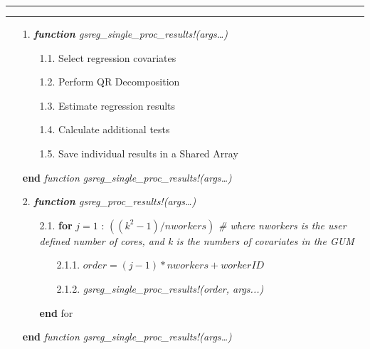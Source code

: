 \documentclass{juliacon}
\begin{document}
\begin{minipage}{0.5\textwidth}
\hrule
{}
\vspace{2mm}
\hrule
  \begin{enumerate}
    
    \item[1.] \textit{\textbf{function} gsreg\_single\_proc\_results!(args…)}
    \begin{enumerate}
        \item[1.1.] Select regression covariates
        \item[1.2.] Perform QR Decomposition
        \item[1.3.] Estimate regression results
        \item[1.4.] Calculate additional tests
        \item[1.5.] Save individual results in a Shared Array
    \end{enumerate}
    \item[] \textbf{end} \textit{function gsreg\_single\_proc\_results!(args…)}

\vspace{2mm}
    
    \item[2.] \textit{\textbf{function} gsreg\_proc\_results!(args…)}
    \begin{enumerate}
        \item[2.1.] \textbf{for} $j=1$ : $((k^2-1)/ nworkers)$ \textit{\# where nworkers is the user defined number of cores, and k is the numbers of covariates in the GUM}
        \begin{enumerate}
            \item[2.1.1.] $order = (j -1) * nworkers + workerID$
            \item[2.1.2.] \textit{gsreg\_single\_proc\_results!(order, args...)}
        \end{enumerate}
        \item[] \textbf{end} for
    \end{enumerate}
    \item[] \textbf{end} \textit{function gsreg\_single\_proc\_results!(args…)}
    
\vspace{2mm}


\end{enumerate}
\end{minipage}
\end{document}
